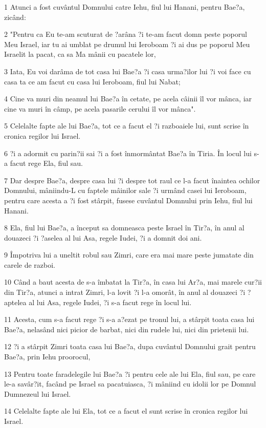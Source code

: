 \par 1 Atunci a fost cuvântul Domnului catre Iehu, fiul lui Hanani, pentru Bae?a, zicând:
\par 2 "Pentru ca Eu te-am scuturat de ?arâna ?i te-am facut domn peste poporul Meu Israel, iar tu ai umblat pe drumul lui Ieroboam ?i ai dus pe poporul Meu Israelit la pacat, ca sa Ma mânii cu pacatele lor,
\par 3 Iata, Eu voi darâma de tot casa lui Bae?a ?i casa urma?ilor lui ?i voi face cu casa ta ce am facut cu casa lui Ieroboam, fiul lui Nabat;
\par 4 Cine va muri din neamul lui Bae?a în cetate, pe acela câinii îl vor mânca, iar cine va muri în câmp, pe acela pasarile cerului îl vor mânca".
\par 5 Celelalte fapte ale lui Bae?a, tot ce a facut el ?i razboaiele lui, sunt scrise în cronica regilor lui Israel.
\par 6 ?i a adormit cu parin?ii sai ?i a fost înmormântat Bae?a în Tiria. În locul lui s-a facut rege Ela, fiul sau.
\par 7 Dar despre Bae?a, despre casa lui ?i despre tot raul ce l-a facut înaintea ochilor Domnului, mâniindu-L cu faptele mâinilor sale ?i urmând casei lui Ieroboam, pentru care acesta a ?i fost stârpit, fusese cuvântul Domnului prin Iehu, fiul lui Hanani.
\par 8 Ela, fiul lui Bae?a, a început sa domneasca peste Israel în Tir?a, în anul al douazeci ?i ?aselea al lui Asa, regele Iudei, ?i a domnit doi ani.
\par 9 Împotriva lui a uneltit robul sau Zimri, care era mai mare peste jumatate din carele de razboi.
\par 10 Când a baut acesta de s-a îmbatat la Tir?a, în casa lui Ar?a, mai marele cur?ii din Tir?a, atunci a intrat Zimri, l-a lovit ?i l-a omorât, în anul al douazeci ?i ?aptelea al lui Asa, regele Iudei, ?i s-a facut rege în locul lui.
\par 11 Acesta, cum s-a facut rege ?i s-a a?ezat pe tronul lui, a stârpit toata casa lui Bae?a, nelasând nici picior de barbat, nici din rudele lui, nici din prietenii lui.
\par 12 ?i a stârpit Zimri toata casa lui Bae?a, dupa cuvântul Domnului grait pentru Bae?a, prin Iehu proorocul,
\par 13 Pentru toate faradelegile lui Bae?a ?i pentru cele ale lui Ela, fiul sau, pe care le-a savâr?it, facând pe Israel sa pacatuiasca, ?i mâniind cu idolii lor pe Domnul Dumnezeul lui Israel.
\par 14 Celelalte fapte ale lui Ela, tot ce a facut el sunt scrise în cronica regilor lui Israel.

